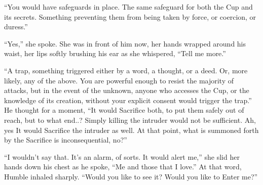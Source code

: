 “You would have safeguards in place. The same safeguard for both the Cup and its secrets. Something preventing them from being taken by force, or coercion, or duress.”

“Yes,” she spoke. She was in front of him now, her hands wrapped around his waist, her lips softly brushing his ear as she whispered, “Tell me more.”

“A trap, something triggered either by a word, a thought, or a deed. Or, more likely, any of the above. You are powerful enough to resist the majority of attacks, but in the event of the unknown, anyone who accesses the Cup, or the knowledge of its creation, without your explicit consent would trigger the trap.” He thought for a moment, “It would Sacrifice both, to put them safely out of reach, but to what end..? Simply killing the intruder would not be sufficient. Ah, yes{\el} It would Sacrifice the intruder as well. At that point, what is summoned forth by the Sacrifice is inconsequential, no?”

“I wouldn’t say that. It’s an alarm, of sorts. It would alert me,” she slid her hands down his chest as he spoke, “Me and those that I love.” At that word, Humble inhaled sharply. “Would you like to see it? Would you like to{\el} Enter me?”

